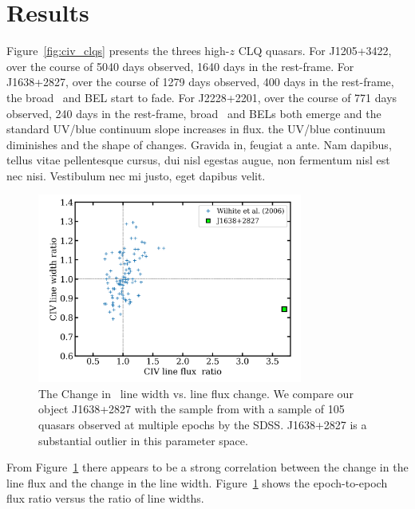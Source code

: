\documentclass[a4paper,fleqn,usenatbib]{mnras}
\begin{document}
\section{Results}
Figure~\ref{fig:civ_clqs} presents the threes high-$z$ CLQ quasars. 
For J1205+3422, over the course of 5040 days observed, 1640 days in the
rest-frame. 
For J1638+2827, over the course of 1279 days observed, 400 days in the
rest-frame, the broad \civ\ and \ciii BEL start to fade.  For
J2228+2201, over the course of 771 days observed, 240 days in the
rest-frame, broad \civ\ and \ciii BELs both emerge and the standard
UV/blue continuum slope increases in flux.  the UV/blue continuum
diminishes and the shape of \lya changes.
Gravida in, feugiat a ante. Nam dapibus, tellus vitae pellentesque
cursus, dui nisl egestas augue, non fermentum nisl est nec
nisi. Vestibulum nec mi justo, eget dapibus velit.


\begin{figure}
  \centering
  \includegraphics[width=8.7cm, trim=0.2cm 0.2cm 0.2cm 0.2cm, clip]
  {figures/Wilhite_2006_Fig2_redux_20190926.png}
   \vspace{-12pt}
  \caption[]{The Change in \civ\ line width vs. line flux change. 
We compare our object J1638+2827 with the sample 
from \citet{Wilhite2006} with a sample of 105 quasars observed at
multiple epochs by the SDSS. J1638+2827 is a substantial outlier 
in this parameter space.}
  \label{fig:Wilhite2006_comparison}
\end{figure}
From Figure~\ref{fig:Wilhite2006_comparison} there appears to be a
strong correlation between the change in the line flux and the change
in the line width.  Figure~\ref{fig:Wilhite2006_comparison} shows the
epoch-to-epoch flux ratio versus the ratio of line widths.
\end{document}
